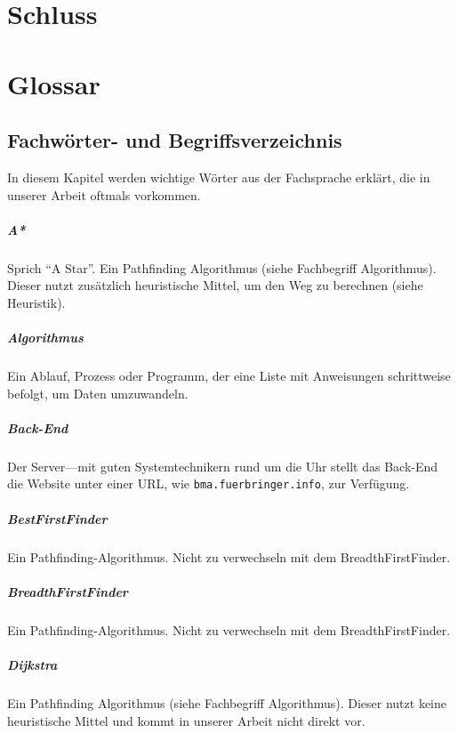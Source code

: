 \documentclass[12pt,a4paper,german]{report}
\begin{document}
\chapter{Schluss}
\blindtext

\chapter{Glossar}
\section*{Fachwörter- und Begriffsverzeichnis}
In diesem Kapitel werden wichtige Wörter aus der Fachsprache erklärt, die in unserer Arbeit oftmals vorkommen.
\paragraph{A*} Sprich ``A Star''. Ein Pathfinding Algorithmus (siehe Fachbegriff Algorithmus). Dieser nutzt zusätzlich heuristische Mittel, um den Weg zu berechnen (siehe Heuristik).
\paragraph{Algorithmus} Ein Ablauf, Prozess oder Programm, der eine Liste mit Anweisungen schrittweise befolgt, um Daten umzuwandeln.
\paragraph{Back-End} Der Server---mit guten Systemtechnikern rund um die Uhr stellt das Back-End die Website unter einer URL, wie \texttt{bma.fuerbringer.info}, zur Verfügung.
\paragraph{BestFirstFinder} Ein Pathfinding-Algorithmus. Nicht zu verwechseln mit dem BreadthFirstFinder.
\paragraph{BreadthFirstFinder} Ein Pathfinding-Algorithmus. Nicht zu verwechseln mit dem BreadthFirstFinder.
\paragraph{Dijkstra} Ein Pathfinding Algorithmus (siehe Fachbegriff Algorithmus). Dieser nutzt keine heuristische Mittel und kommt in unserer Arbeit nicht direkt vor.
\end{document}
